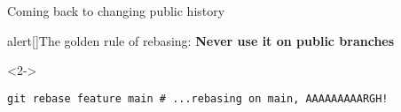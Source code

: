 \documentclass[usenames,svgnames,14pt]{beamer}
\begin{document}
\begin{frame}[fragile]{Coming back to changing public history}
    \begin{overlayarea}{\textwidth}{0.7\textheight}
        \begin{varblock}{alert}[\textwidth]{The golden rule of rebasing: \textbf{Never use it on public branches}}
            \vspace{2mm}
            \usebox{\savedTikZ}
            \vspace{3mm}
            \begin{uncoverenv}<2->
                \begin{lstlisting}[style=MyBash]
                    git rebase feature main # ...rebasing on main, AAAAAAAAARGH!
                \end{lstlisting}
            \end{uncoverenv}
        \end{varblock}
    \end{overlayarea}
\end{frame}


\end{document}
